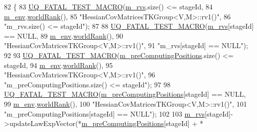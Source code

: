 \begin{DoxyCode}
82 \{
83   \hyperlink{_defines_8h_a56d63d18d0a6d45757de47fcc06f574d}{UQ\_FATAL\_TEST\_MACRO}(\hyperlink{class_q_u_e_s_o_1_1_base_t_k_group_a87c6b02ea45ab3de634c22afa58f53a5}{m\_rvs}.size() <= stageId,
84                       \hyperlink{class_q_u_e_s_o_1_1_base_t_k_group_a2bce5e8aa5c844d4332a0e73cf00a1f9}{m\_env}.\hyperlink{class_q_u_e_s_o_1_1_base_environment_a78b57112bbd0e6dd0e8afec00b40ffa7}{worldRank}(),
85                       \textcolor{stringliteral}{"HessianCovMatricesTKGroup<V,M>::rv1()"},
86                       \textcolor{stringliteral}{"m\_rvs.size() <= stageId"});
87 
88   \hyperlink{_defines_8h_a56d63d18d0a6d45757de47fcc06f574d}{UQ\_FATAL\_TEST\_MACRO}(\hyperlink{class_q_u_e_s_o_1_1_base_t_k_group_a87c6b02ea45ab3de634c22afa58f53a5}{m\_rvs}[stageId] == NULL,
89                       \hyperlink{class_q_u_e_s_o_1_1_base_t_k_group_a2bce5e8aa5c844d4332a0e73cf00a1f9}{m\_env}.\hyperlink{class_q_u_e_s_o_1_1_base_environment_a78b57112bbd0e6dd0e8afec00b40ffa7}{worldRank}(),
90                       \textcolor{stringliteral}{"HessianCovMatricesTKGroup<V,M>::rv1()"},
91                       \textcolor{stringliteral}{"m\_rvs[stageId] == NULL"});
92 
93   \hyperlink{_defines_8h_a56d63d18d0a6d45757de47fcc06f574d}{UQ\_FATAL\_TEST\_MACRO}(\hyperlink{class_q_u_e_s_o_1_1_base_t_k_group_a93d7fe55e30a7c6f209b01cb8a67e322}{m\_preComputingPositions}.size() <= stageId,
94                       \hyperlink{class_q_u_e_s_o_1_1_base_t_k_group_a2bce5e8aa5c844d4332a0e73cf00a1f9}{m\_env}.\hyperlink{class_q_u_e_s_o_1_1_base_environment_a78b57112bbd0e6dd0e8afec00b40ffa7}{worldRank}(),
95                       \textcolor{stringliteral}{"HessianCovMatricesTKGroup<V,M>::rv1()"},
96                       \textcolor{stringliteral}{"m\_preComputingPositions.size() <= stageId"});
97 
98   \hyperlink{_defines_8h_a56d63d18d0a6d45757de47fcc06f574d}{UQ\_FATAL\_TEST\_MACRO}(\hyperlink{class_q_u_e_s_o_1_1_base_t_k_group_a93d7fe55e30a7c6f209b01cb8a67e322}{m\_preComputingPositions}[stageId] == NULL,
99                       \hyperlink{class_q_u_e_s_o_1_1_base_t_k_group_a2bce5e8aa5c844d4332a0e73cf00a1f9}{m\_env}.\hyperlink{class_q_u_e_s_o_1_1_base_environment_a78b57112bbd0e6dd0e8afec00b40ffa7}{worldRank}(),
100                       \textcolor{stringliteral}{"HessianCovMatricesTKGroup<V,M>::rv1()"},
101                       \textcolor{stringliteral}{"m\_preComputingPositions[stageId] == NULL"});
102 
103   \hyperlink{class_q_u_e_s_o_1_1_base_t_k_group_a87c6b02ea45ab3de634c22afa58f53a5}{m\_rvs}[stageId]->updateLawExpVector(*\hyperlink{class_q_u_e_s_o_1_1_base_t_k_group_a93d7fe55e30a7c6f209b01cb8a67e322}{m\_preComputingPositions}[stageId] + *

\end{DoxyCode}
